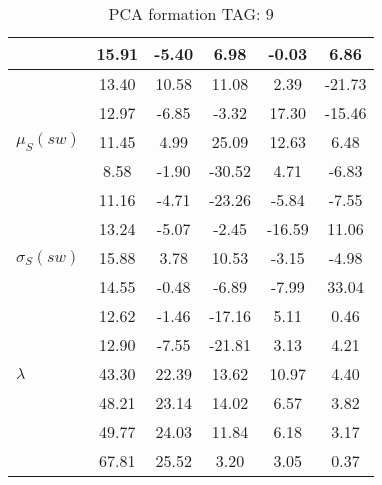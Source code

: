 \begin{table}[h!]
\begin{center}
\begin{tabular}{| l | c | c | c | c | c |}
 & 15.91  & -5.40  & 6.98  & -0.03  & 6.86 \\\hline
 & 13.40  & 10.58  & 11.08  & 2.39  & -21.73 \\\hline
 & 12.97  & -6.85  & -3.32  & 17.30  & -15.46 \\\hline
$\mu_S(sw)$ & 11.45  & 4.99  & 25.09  & 12.63  & 6.48 \\\hline
 & 8.58  & -1.90  & -30.52  & 4.71  & -6.83 \\\hline
 & 11.16  & -4.71  & -23.26  & -5.84  & -7.55 \\\hline
 & 13.24  & -5.07  & -2.45  & -16.59  & 11.06 \\\hline
$\sigma_S(sw)$ & 15.88  & 3.78  & 10.53  & -3.15  & -4.98 \\\hline
 & 14.55  & -0.48  & -6.89  & -7.99  & 33.04 \\\hline
 & 12.62  & -1.46  & -17.16  & 5.11  & 0.46 \\\hline
 & 12.90  & -7.55  & -21.81  & 3.13  & 4.21 \\\hline
$\lambda$ & 43.30  & 22.39  & 13.62  & 10.97  & 4.40 \\\hline
 & 48.21  & 23.14  & 14.02  & 6.57  & 3.82 \\\hline
 & 49.77  & 24.03  & 11.84  & 6.18  & 3.17 \\\hline
 & 67.81  & 25.52  & 3.20  & 3.05  & 0.37 \\\hline
\end{tabular}
\caption{PCA formation TAG: 9}
\end{center}
\end{table}